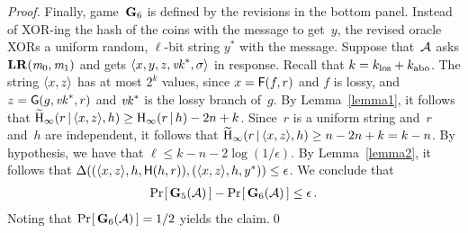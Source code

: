 \begin{proof}
  Finally, game~$\mathbf{G}_6$ is defined by the revisions in the bottom panel. Instead
  of XOR-ing the hash of the coins with the message to get~$y$, the revised
  oracle XORs a uniform random, $\ell$-bit string $y^*$ with the message.
  Suppose that~$\mathcal{A}$ asks $\mathbf{LR}(\mathit{m}_0, \mathit{m}_1)$ and gets
  $\langle x,y,z,\mathit{vk}^*,\sigma \rangle$ in response.
  Recall that $k = k_\los + k_\abo$.
  The string $\langle x,z \rangle$ has at most $2^k$ values, since $x=\mathsf{F}(f,r)$ and
  $f$ is lossy, and $z = \mathsf{G}(g,\mathit{vk}^*,r)$ and $\mathit{vk}^*$ is the lossy branch
  of~$g$.
  By Lemma~\ref{lemma1}, it follows that $\widetilde{\mathrm{H}}_\infty(r \,|\, \langle x,z \rangle,h) \ge
  \mathrm{H}_\infty(r \,|\, h) - 2n+k$.
  Since~$r$ is a uniform string and~$r$ and~$h$ are independent, it follows that
  $\widetilde{\mathrm{H}}_\infty(r \,|\, \langle x,z \rangle,h) \ge n- 2n+k = k-n$.
  By hypothesis, we have that $\ell \leq k - n - 2\log(1/\epsilon)$.
  By Lemma~\ref{lemma2}, it follows that
  $\mathrm{\Delta}( (\langle x,z \rangle, h, \mathsf{H}(h,r)), (\langle x,z \rangle, h, y^*) ) \leq \epsilon$.
  We conclude that
  \begin{eqnarray}
    {\Pr\hspace{-1pt}\left[\,{\mathbf{G}_5(\mathcal{A})}\,\right]} - {\Pr\hspace{-1pt}\left[\,{\mathbf{G}_6(\mathcal{A})}\,\right]} \leq \epsilon \,.
  \end{eqnarray}
  Noting that ${\Pr\hspace{-1pt}\left[\,{\mathbf{G}_6(\mathcal{A})}\,\right]} = 1/2$ yields the claim.\qed


\end{proof}
